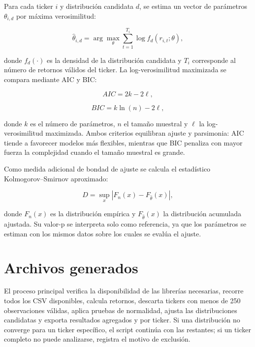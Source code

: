Para cada ticker $i$ y distribuci\'on candidata $d$, se estima un vector de par\'ametros $\theta_{i,d}$ por m\'axima verosimilitud:

\begin{equation}
\hat{\theta}_{i,d}
= \arg\max_{\theta}
\sum_{t=1}^{T_i}
\log f_d(r_{i,t};\theta),
\end{equation}

donde $f_d(\cdot)$ es la densidad de la distribuci\'on candidata y $T_i$ corresponde al n\'umero de retornos v\'alidos del ticker. La log-verosimilitud maximizada se compara mediante AIC y BIC:

\begin{equation}
AIC = 2k - 2\ell,
\end{equation}

\begin{equation}
BIC = k\ln(n) - 2\ell,
\end{equation}

donde $k$ es el n\'umero de par\'ametros, $n$ el tama\~no muestral y $\ell$ la log-verosimilitud maximizada. Ambos criterios equilibran ajuste y parsimonia: AIC tiende a favorecer modelos m\'as flexibles, mientras que BIC penaliza con mayor fuerza la complejidad cuando el tama\~no muestral es grande.

Como medida adicional de bondad de ajuste se calcula el estad\'istico Kolmogorov--Smirnov aproximado:

\begin{equation}
D = \sup_x |F_n(x) - F_{\hat{\theta}}(x)|,
\end{equation}

donde $F_n(x)$ es la distribuci\'on emp\'irica y $F_{\hat{\theta}}(x)$ la distribuci\'on acumulada ajustada. Su valor-p se interpreta solo como referencia, ya que los par\'ametros se estiman con los mismos datos sobre los cuales se eval\'ua el ajuste.

\section*{Archivos generados}

El proceso principal verifica la disponibilidad de las librer\'ias necesarias, recorre todos los CSV disponibles, calcula retornos, descarta tickers con menos de 250 observaciones v\'alidas, aplica pruebas de normalidad, ajusta las distribuciones candidatas y exporta resultados agregados y por ticker. Si una distribuci\'on no converge para un ticker espec\'ifico, el script contin\'ua con las restantes; si un ticker completo no puede analizarse, registra el motivo de exclusi\'on.

